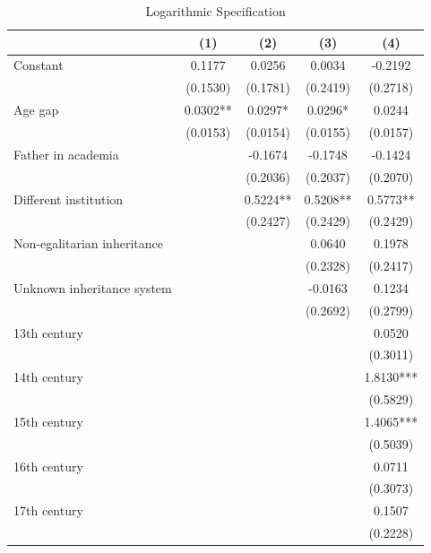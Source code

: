 \begin{table}[H]
\centering
\caption{Logarithmic Specification}
\label{tab:log_regressions}

\begin{tablebody}
\begin{tabular}{lcccc}
\toprule
& (1) & (2) & (3) & (4) \\
\midrule

Constant
& 0.1177
& 0.0256
& 0.0034
& -0.2192 \\
& (0.1530)
& (0.1781)
& (0.2419)
& (0.2718) \\

Age gap 
& 0.0302** 
& 0.0297* 
& 0.0296* 
& 0.0244 \\
& (0.0153) 
& (0.0154) 
& (0.0155) 
& (0.0157) \\

Father in academia 
&  
& -0.1674 
& -0.1748 
& -0.1424 \\
&  
& (0.2036) 
& (0.2037) 
& (0.2070) \\

Different institution 
&  
& 0.5224** 
& 0.5208** 
& 0.5773** \\
&  
& (0.2427) 
& (0.2429) 
& (0.2429) \\

Non-egalitarian inheritance 
&  
&  
& 0.0640 
& 0.1978 \\
&  
&  
& (0.2328) 
& (0.2417) \\

Unknown inheritance system 
&  
&  
& -0.0163 
& 0.1234 \\
&  
&  
& (0.2692) 
& (0.2799) \\

13th century
& & & & 0.0520 \\
& & & & (0.3011) \\

14th century
& & & & 1.8130*** \\
& & & & (0.5829) \\

15th century
& & & & 1.4065*** \\
& & & & (0.5039) \\

16th century
& & & & 0.0711 \\
& & & & (0.3073) \\

17th century
& & & & 0.1507 \\
& & & & (0.2228) \\


\end{tabular}
\end{tablebody}
\end{table}
